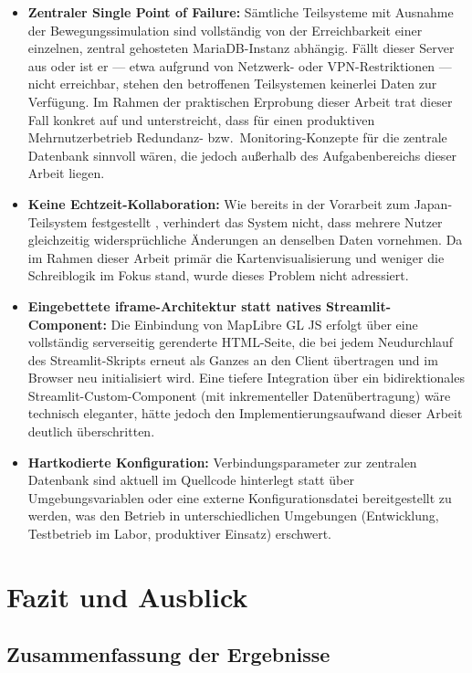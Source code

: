 \documentclass[12pt,a4paper]{report}
\begin{document}
\begin{itemize}
    \item \textbf{Zentraler Single Point of Failure:} Sämtliche Teilsysteme mit Ausnahme der Bewegungssimulation sind vollständig von der Erreichbarkeit einer einzelnen, zentral gehosteten MariaDB-Instanz abhängig. Fällt dieser Server aus oder ist er — etwa aufgrund von Netzwerk- oder VPN-Restriktionen — nicht erreichbar, stehen den betroffenen Teilsystemen keinerlei Daten zur Verfügung. Im Rahmen der praktischen Erprobung dieser Arbeit trat dieser Fall konkret auf und unterstreicht, dass für einen produktiven Mehrnutzerbetrieb Redundanz- bzw.\ Monitoring-Konzepte für die zentrale Datenbank sinnvoll wären, die jedoch außerhalb des Aufgabenbereichs dieser Arbeit liegen.
    \item \textbf{Keine Echtzeit-Kollaboration:} Wie bereits in der Vorarbeit zum Japan-Teilsystem festgestellt \cite{TODO:LorenzBA}, verhindert das System nicht, dass mehrere Nutzer gleichzeitig widersprüchliche Änderungen an denselben Daten vornehmen. Da im Rahmen dieser Arbeit primär die Kartenvisualisierung und weniger die Schreiblogik im Fokus stand, wurde dieses Problem nicht adressiert.
    \item \textbf{Eingebettete iframe-Architektur statt natives Streamlit-Component:} Die Einbindung von MapLibre GL JS erfolgt über eine vollständig serverseitig gerenderte HTML-Seite, die bei jedem Neudurchlauf des Streamlit-Skripts erneut als Ganzes an den Client übertragen und im Browser neu initialisiert wird. Eine tiefere Integration über ein bidirektionales Streamlit-Custom-Component (mit inkrementeller Datenübertragung) wäre technisch eleganter, hätte jedoch den Implementierungsaufwand dieser Arbeit deutlich überschritten.
    \item \textbf{Hartkodierte Konfiguration:} Verbindungsparameter zur zentralen Datenbank sind aktuell im Quellcode hinterlegt statt über Umgebungsvariablen oder eine externe Konfigurationsdatei bereitgestellt zu werden, was den Betrieb in unterschiedlichen Umgebungen (Entwicklung, Testbetrieb im Labor, produktiver Einsatz) erschwert.
\end{itemize}

\chapter{Fazit und Ausblick}

\section{Zusammenfassung der Ergebnisse}
\end{document}
